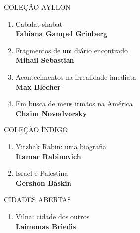 \pagebreak
\pagestyle{empty}

\begingroup
\fontsize{7}{8}%

\scriptsize
{\formular\large{COLEÇÃO AYLLON}}
\begin{enumerate}
\setlength\parskip{4.2pt}
\setlength\itemsep{-1.4mm}
\item Cabalat shabat\\ \textbf{Fabiana Gampel Grinberg}
\setlength\parskip{8pt}
\item Fragmentos de um diário encontrado\\ \textbf{Mihail Sebastian}
\item Acontecimentos na irrealidade imediata\\ \textbf{Max Blecher}
\item Em busca de meus irmãos na América\\ \textbf{Chaim Novodvorsky}
\end{enumerate}

\scriptsize
{\formular\large{COLEÇÃO ÍNDIGO}}
\begin{enumerate}
\setlength\parskip{4.2pt}
\setlength\itemsep{-1.4mm}
\item Yitzhak Rabin: uma biografia\\ \textbf{Itamar Rabinovich}
\setlength\parskip{8pt}
\item Israel e Palestina\\ \textbf{Gershon Baskin}
\end{enumerate}

\scriptsize
{\formular\large{CIDADES ABERTAS}}
\begin{enumerate}
\setlength\parskip{4.2pt}
\setlength\itemsep{-1.4mm}
\item Vilna: cidade dos outros\\ \textbf{Laimonas Briedis}
\end{enumerate}

\pagebreak